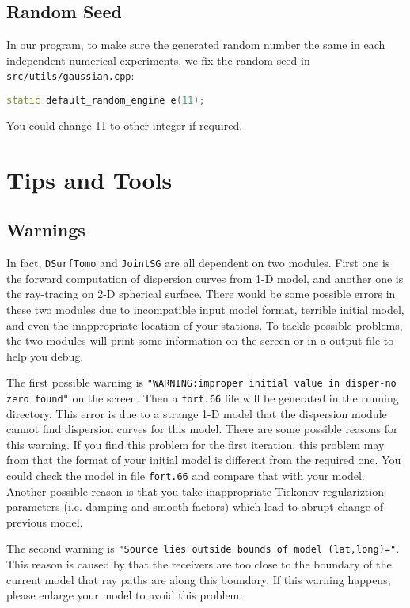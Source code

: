 \documentclass[UTF8]{article}
\begin{document}
\subsection{Random Seed}
In our program, to make sure the generated random number the same
in each independent numerical experiments, we fix the random seed
in \texttt{src/utils/gaussian.cpp}:
\begin{lstlisting}[language=c++]
static default_random_engine e(11);
\end{lstlisting}
You could change 11 to other integer if required.

\section{Tips and Tools}
\subsection{Warnings}
In fact, \texttt{DSurfTomo} and \texttt{JointSG} are all dependent 
on two modules. First one is the forward computation of dispersion 
curves from 1-D model, and another one is the ray-tracing on 
2-D spherical surface. There would be some possible errors in these 
two modules due to incompatible input model format, terrible initial 
model, and even the inappropriate location of your stations. To tackle possible 
problems, the two modules will print some information on the screen 
or in a output file to help you debug.

The first possible warning is \texttt{"WARNING:improper initial value in 
disper-no zero found"} on the screen. Then a \texttt{fort.66} file will 
be generated in the running directory. This error is due to 
a strange 1-D model that the dispersion module cannot find 
dispersion curves for this model. There are some possible reasons for 
this warning. If you find this problem for the first iteration,
this problem may from that the format of your initial model 
is different from the required one. You could check the model in 
file \texttt{fort.66} and compare that with your model. 
Another possible reason is that you take inappropriate 
Tickonov regulariztion parameters (i.e. damping and smooth factors)
which lead to abrupt change of previous model.

The second warning is \texttt{"Source lies outside bounds 
of model (lat,long)="}.
This reason is caused by that the receivers are too close to 
the boundary of the current model that ray paths are along 
this boundary. If this warning happens, please enlarge your 
model to avoid this problem.
\end{document}
